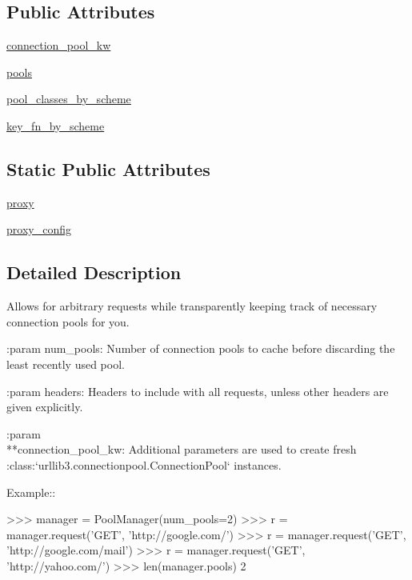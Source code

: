 \subsection*{Public Attributes}
\begin{DoxyCompactItemize}
\item 
\hyperlink{classpip_1_1__vendor_1_1urllib3_1_1poolmanager_1_1PoolManager_a509374901e1f086853c6df9928b7312a}{connection\+\_\+pool\+\_\+kw}
\item 
\hyperlink{classpip_1_1__vendor_1_1urllib3_1_1poolmanager_1_1PoolManager_a0677ea3fbf3ddfc088b284c56377e35e}{pools}
\item 
\hyperlink{classpip_1_1__vendor_1_1urllib3_1_1poolmanager_1_1PoolManager_a40d9cd018f9467aee2841c06d83ccfe2}{pool\+\_\+classes\+\_\+by\+\_\+scheme}
\item 
\hyperlink{classpip_1_1__vendor_1_1urllib3_1_1poolmanager_1_1PoolManager_aa67bdb3813fdcaa695cfb60b9741c3bd}{key\+\_\+fn\+\_\+by\+\_\+scheme}
\end{DoxyCompactItemize}
\subsection*{Static Public Attributes}
\begin{DoxyCompactItemize}
\item 
\hyperlink{classpip_1_1__vendor_1_1urllib3_1_1poolmanager_1_1PoolManager_a237e5af864203b1b19f4abec4dc9a908}{proxy}
\item 
\hyperlink{classpip_1_1__vendor_1_1urllib3_1_1poolmanager_1_1PoolManager_a172d98ef9b90b01ad76e686efbf0a5b2}{proxy\+\_\+config}
\end{DoxyCompactItemize}


\subsection{Detailed Description}
\begin{DoxyVerb}Allows for arbitrary requests while transparently keeping track of
necessary connection pools for you.

:param num_pools:
    Number of connection pools to cache before discarding the least
    recently used pool.

:param headers:
    Headers to include with all requests, unless other headers are given
    explicitly.

:param \\**connection_pool_kw:
    Additional parameters are used to create fresh
    :class:`urllib3.connectionpool.ConnectionPool` instances.

Example::

    >>> manager = PoolManager(num_pools=2)
    >>> r = manager.request('GET', 'http://google.com/')
    >>> r = manager.request('GET', 'http://google.com/mail')
    >>> r = manager.request('GET', 'http://yahoo.com/')
    >>> len(manager.pools)
    2\end{DoxyVerb}
 

